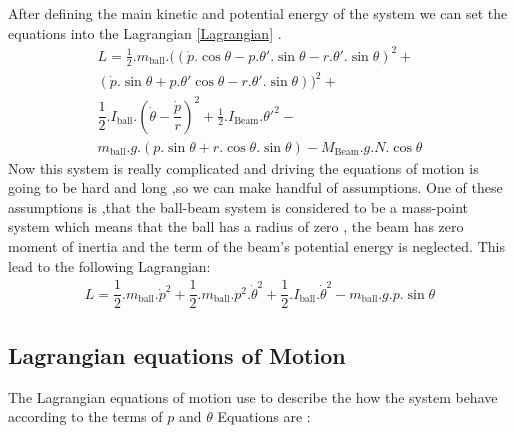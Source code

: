 \documentclass{article}
\begin{document}
After defining the main kinetic and potential energy of the system we can set the 
equations into the Lagrangian \ref{Lagrangian} .
\begin{multline}
		L =  \frac{1}{2}.m_{\text{ball}}.((\dot{p}.\cos{\theta}-p.\theta'.\sin{\theta} - r.\theta'.\sin{\theta})^2 + \\
		(\dot{p}.\sin{\theta}+ p.\theta'\cos{\theta} - r.\theta'.\sin{\theta}) )^2 + \\
		\dfrac{1}{2}.I_{\text{ball}}.(\dot{\theta} - \dfrac{\dot{p}}{r})^2 + \frac{1}{2}.I_{\text{Beam}}.\theta'^2 - \\
		m_{\text{ball}}.g.(p.\sin{\theta} + r.\cos{\theta}.\sin{\theta})-M_{\text{Beam}}.g.N.\cos{\theta}
\end{multline}
Now this system is really complicated and driving the equations of motion is going to be hard and long ,so we can make handful of assumptions.
One of these assumptions is ,that the ball-beam system is considered to be a mass-point system which means that the ball has a radius of zero , the beam has zero moment of inertia and the term of the
beam's potential energy is neglected.
This lead to the following Lagrangian:
\begin{equation}
	\begin{split}
		L = \dfrac{1}{2}.m_{\text{ball}}.\dot{p}^2 + \dfrac{1}{2}.m_{\text{ball}}.p^2.\dot{\theta}^2 + \dfrac{1}{2}.I_{\text{ball}}.\dot{\theta}^2 - m_{\text{ball}}.g.p.\sin{\theta}
	\end{split}
\end{equation}

\newpage
\subsection{Lagrangian equations of Motion}
The Lagrangian equations of motion use to describe the how the system behave according to the terms of $p$ and $\theta$
Equations are :
\end{document}
